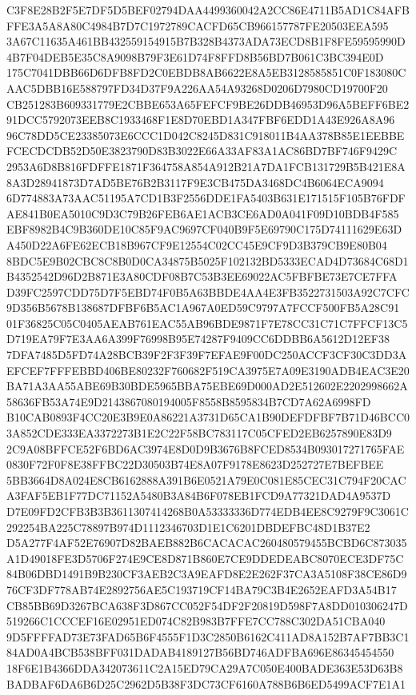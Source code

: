 \documentclass[UTF8,fontset=fandol,zihao=-4,a4paper]{ctexart}
\begin{document}
{{C3F8E28B2F5E7DF5D5BEF02794DAA4499360042A2CC86E4711B5AD1C84AFBFFE3A5A8A80C4984B7D7C1972789CACFD65CB966157787FE20503EEA595
3A67C11635A461BB432559154915B7B328B4373ADA73ECD8B1F8FE59595990D4B7F04DEB5E35C8A9098B79F3E61D74F8FFD8B56BD7B061C3BC394E0D
175C7041DBB66D6DFB8FD2C0EBDB8AB6622E8A5EB3128585851C0F183080CAAC5DBB16E588797FD34D37F9A226AA54A93268D0206D7980CD19700F20
CB251283B609331779E2CBBE653A65FEFCF9BE26DDB46953D96A5BEFF6BE291DCC5792073EEB8C1933468F1E8D70EBD1A347FBF6EDD1A43E926A8A96
96C78DD5CE23385073E6CCC1D042C8245D831C918011B4AA378B85E1EEBBEFCECDCDB52D50E3823790D83B3022E66A33AF83A1AC86BD7BF746F9429C
2953A6D8B816FDFFE1871F364758A854A912B21A7DA1FCB131729B5B421E8A8A3D28941873D7AD5BE76B2B3117F9E3CB475DA3468DC4B6064ECA9094
6D774883A73AAC51195A7CD1B3F2556DDE1FA5403B631E171515F105B76FDFAE841B0EA5010C9D3C79B26FEB6AE1ACB3CE6AD0A041F09D10BDB4F585
EBF8982B4C9B360DE10C85F9AC9697CF040B9F5E69790C175D74111629E63DA450D22A6FE62ECB18B967CF9E12554C02CC45E9CF9D3B379CB9E80B04
8BDC5E9B02CBC8C8B0D0CA34875B5025F102132BD5333ECAD4D73684C68D1B4352542D96D2B871E3A80CDF08B7C53B3EE69022AC5FBFBE73E7CE7FFA
D39FC2597CDD75D7F5EBD74F0B5A63BBDE4AA4E3FB3522731503A92C7CFC9D356B5678B138687DFBF6B5AC1A967A0ED59C9797A7FCCF500FB5A28C91
01F36825C05C0405AEAB761EAC55AB96BDE9871F7E78CC31C71C7FFCF13C5D719EA79F7E3AA6A399F76998B95E74287F9409CC6DDBB6A5612D12EF38
7DFA7485D5FD74A28BCB39F2F3F39F7EFAE9F00DC250ACCF3CF30C3DD3AEFCEF7FFFEBBD406BE80232F760682F519CA3975E7A09E3190ADB4EAC3E20
BA71A3AA55ABE69B30BDE5965BBA75EBE69D000AD2E512602E2202998662A58636FB53A74E9D2143867080194005F8558B8595834B7CD7A62A6998FD
B10CAB0893F4CC20E3B9E0A86221A3731D65CA1B90DEFDFBF7B71D46BCC03A852CDE333EA3372273B1E2C22F58BC783117C05CFED2EB6257890E83D9
2C9A08BFFCE52F6BD6AC3974E8D0D9B3676B8FCED8534B093017271765FAE0830F72F0F8E38FFBC22D30503B74E8A07F9178E8623D252727E7BEFBEE
5BB3664D8A024E8CB6162888A391B6E0521A79E0C081E85CEC31C794F20CACA3FAF5EB1F77DC71152A5480B3A84B6F078EB1FCD9A77321DAD4A9537D
D7E09FD2CFB3B3B3611307414268B0A53333336D774EDB4EE8C9279F9C3061C292254BA225C78897B974D1112346703D1E1C6201DBDEFBC48D1B37E2
D5A277F4AF52E76907D82BAEB882B6CACACAC260480579455BCBD6C873035A1D49018FE3D5706F274E9CE8D871B860E7CE9DDEDEABC8070ECE3DF75C
84B06DBD1491B9B230CF3AEB2C3A9EAFD8E2E262F37CA3A5108F38CE86D976CF3DF778AB74E2892756AE5C193719CF14BA79C3B4E2652EAFD3A54B17
CB85BB69D3267BCA638F3D867CC052F54DF2F20819D598F7A8DD010306247D519266C1CCCEF16E02951ED074C82B983B7FFE7CC788C302DA51CBA040
9D5FFFFAD73E73FAD65B6F4555F1D3C2850B6162C411AD8A152B7AF7BB3C184AD0A4BCB538BFF031DADAB4189127B56BD746ADFBA696E86345454550
18F6E1B4366DDA342073611C2A15ED79CA29A7C050E400BADE363E53D63B8BADBAF6DA6B6D25C2962D5B38F3DC73CF6160A788B6B6ED5499ACF7E1A1
}}
\end{document}
